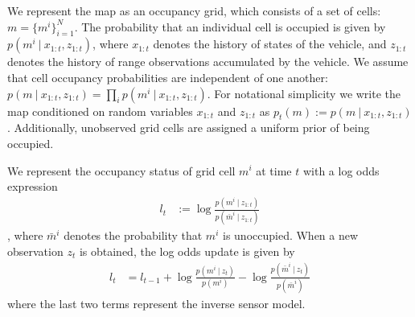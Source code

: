 We represent the map as an occupancy grid, which consists of a set of cells: $m = \{m^{i}\}_{i=1}^{N}$.
The probability that an individual cell is occupied is given by $p\left(m^{i} \ \vert \ x_{1:t}, z_{1:t}\right)$, where $x_{1:t}$ denotes the history of states of the vehicle, and $z_{1:t}$ denotes the history of range observations accumulated by the vehicle.
We assume that cell occupancy probabilities are independent of one another: $p\left(m \ \vert \ x_{1:t}, z_{1:t}\right) = \prod_{i} p\left(m^{i} \ \vert \ x_{1:t}, z_{1:t}\right)$.
For notational simplicity we write the map conditioned on random variables $x_{1:t}$ and $z_{1:t}$ as $p_{t}\left(m\right) := p\left(m \ \vert \ x_{1:t}, z_{1:t}\right)$.
Additionally, unobserved grid cells are assigned a uniform prior of being occupied.

We represent the occupancy status of grid cell $m^i$ at time $t$ with a log odds expression
\begin{align}
  l_t &:= \log \frac{p \left( m^i \ \vert \ z_{1:t} \right)}{p \left( \bar{m}^i \ \vert \ z_{1:t} \right)}
\end{align}
, where $\bar{m}^i$ denotes the probability that $m^i$ is unoccupied.
When a new observation $z_t$ is obtained, the log odds update is given by
\begin{align}
  l_t &= l_{t-1} + \log \frac{p\left( m^i \ \vert \ z_t \right)}{p \left( m^i \right)} - \log \frac{p\left( \bar{m}^i \ \vert \ z_t \right)}{p \left(\bar{m}^i \right)}
\end{align}
where the last two terms represent the inverse sensor model.

